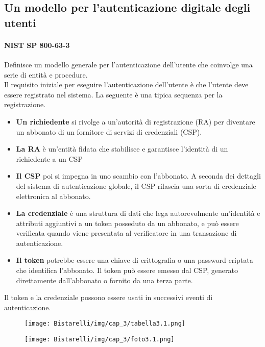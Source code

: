 \newpage
\subsection{Un modello per l'autenticazione digitale degli utenti}
\paragraph{NIST SP 800-63-3} 
Definisce un modello generale per l'autenticazione dell'utente che coinvolge una serie di entità e procedure.
\\

Il requisito iniziale per eseguire l'autenticazione dell'utente è che l'utente deve essere registrato nel sistema. La seguente è una tipica sequenza per la registrazione. 

\begin{itemize}
    \item \textbf{Un richiedente} si rivolge a un'autorità di registrazione (RA) per diventare un abbonato di un fornitore di servizi di credenziali (CSP).
     \item \textbf{La RA} è un'entità fidata che stabilisce e garantisce l'identità di un richiedente a un CSP
     \item \textbf{Il CSP} poi si impegna in uno scambio con l'abbonato. A seconda dei dettagli del sistema di autenticazione globale, il CSP rilascia una sorta di credenziale elettronica al abbonato.
     \item \textbf{La credenziale} è una struttura di dati che lega autorevolmente un'identità e attributi aggiuntivi a un token posseduto da un abbonato, e può essere verificata quando viene presentata al verificatore in una transazione di autenticazione.
     \item \textbf{Il token} potrebbe essere una chiave di crittografia o una password criptata che identifica l'abbonato. Il token può essere emesso dal CSP, generato direttamente dall'abbonato o fornito da una terza parte.
\end{itemize}

Il token e la credenziale possono essere usati in successivi eventi di autenticazione.

\begin{figure}[H]
	\centering
    \texttt{[image: Bistarelli/img/cap\_3/tabella3.1.png]}
\end{figure}

\begin{figure}[H]
	\centering
    \texttt{[image: Bistarelli/img/cap\_3/foto3.1.png]}
\end{figure}


